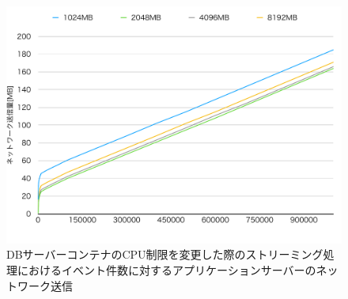 \documentclass[../../../../../main]{subfiles}
\begin{document}
    \begin{figure}[H]
        \centering
        \includegraphics[width=12cm]{graph}
        \caption{DBサーバーコンテナのCPU制限を変更した際のストリーミング処理におけるイベント件数に対するアプリケーションサーバーのネットワーク送信}
        \label{fig:stream-change-db-cpu-limit-app-net-out-app_4_8192-db_1024}
    \end{figure}
\end{document}
